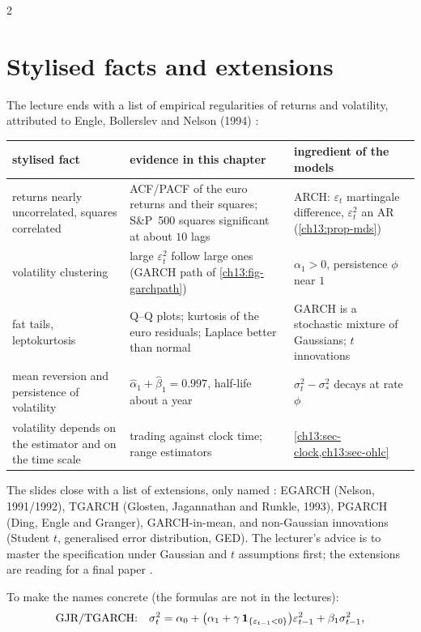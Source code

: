 \begin{paracol}{2}
\section{Stylised facts and extensions}\label{ch13:sec-facts}
The lecture ends with a list of empirical regularities of returns and volatility, attributed to Engle, Bollerslev and Nelson (1994) :
\begin{center}\small
\begin{tabular}{@{}p{3.3cm}p{5.0cm}p{4.4cm}@{}}
\toprule
stylised fact & evidence in this chapter & ingredient of the models\\
\midrule
returns nearly uncorrelated, squares correlated & ACF/PACF of the euro returns and their squares; S\&P~500 squares significant at about $10$ lags & ARCH: $\varepsilon_t$ martingale difference, $\varepsilon_t^2$ an AR (\cref{ch13:prop-mds})\\
volatility clustering & large $\varepsilon_t^2$ follow large ones (GARCH path of \cref{ch13:fig-garchpath}) & $\alpha_1>0$, persistence $\phi$ near $1$\\
fat tails, leptokurtosis & Q--Q plots; kurtosis of the euro residuals; Laplace better than normal & GARCH is a stochastic mixture of Gaussians; $t$ innovations\\
mean reversion and persistence of volatility & $\hat\alpha_1+\hat\beta_1=0.997$, half-life about a year & $\sigma_t^2-\sigma_*^2$ decays at rate $\phi$\\
volatility depends on the estimator and on the time scale & trading against clock time; range estimators & \cref{ch13:sec-clock,ch13:sec-ohlc}\\
\bottomrule
\end{tabular}
\end{center}
The slides close with a list of extensions, only named : EGARCH (Nelson, 1991/1992), TGARCH (Glosten, Jagannathan and Runkle, 1993), PGARCH (Ding, Engle and Granger), GARCH-in-mean, and non-Gaussian innovations
(Student $t$, generalised error distribution, GED). The lecturer's advice is to master the specification under Gaussian and $t$ assumptions first; the extensions are reading for a final paper .
\begin{secondary}
To make the names concrete (the formulas are not in the lectures):
\begin{align}
  \text{GJR/TGARCH:}&\quad \sigma_t^2=\alpha_0+\bigl(\alpha_1+\gamma\,\ind_{\{\varepsilon_{t-1}<0\}}\bigr)\varepsilon_{t-1}^2+\beta_1\sigma_{t-1}^2,\notag\\

\end{align}
\end{secondary}
\end{paracol}
